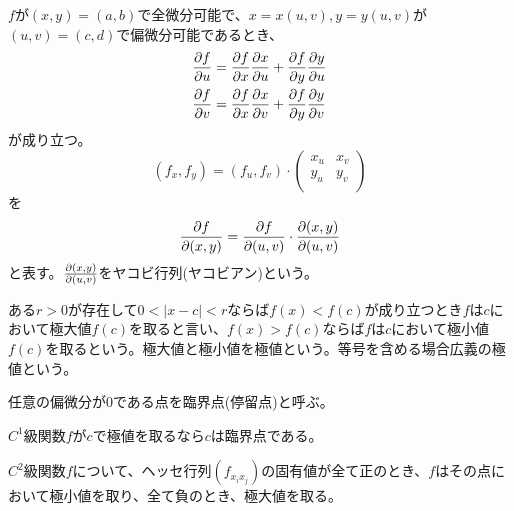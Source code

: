 	\begin{cor}
		$f$が$(x, y) = (a, b)$で全微分可能で、$x = x(u, v), y = y(u, v)$が$(u, v) = (c, d)$で偏微分可能であるとき、
		\begin{align*}
			\pd[f]{u} &= \pd[f]{x}\pd[x]{u} + \pd[f]{y}\pd[y]{u}\\
			\pd[f]{v} &= \pd[f]{x}\pd[x]{v} + \pd[f]{y}\pd[y]{v}\\
		\end{align*}
		が成り立つ。
			\[(f_x, f_y) = (f_u, f_v) \cdot \begin{pmatrix} x_u & x_v \\ y_u & y_v \\\end{pmatrix}\]
		を
			\[\pd[f]{(x, y)} = \pd[f]{(u, v)} \cdot \pd[(x, y)]{(u, v)}\]
		と表す。$\pd[(x, y)]{(u, v)}$をヤコビ行列(ヤコビアン)という。
	\end{cor}

	\begin{thm}[テイラーの定理]
	\end{thm}

\begin{dfn}[極値]
	ある$r > 0$が存在して$0 < |x - c| < r$ならば$f(x) < f(c)$が成り立つとき$f$は$c$において極大値$f(c)$を取ると言い、$f(x) > f(c)$ならば$f$は$c$において極小値$f(c)$を取るという。極大値と極小値を極値という。等号を含める場合広義の極値という。
\end{dfn}
任意の偏微分が0である点を臨界点(停留点)と呼ぶ。
\begin{prop}
	$C^1$級関数$f$が$c$で極値を取るなら$c$は臨界点である。
\end{prop}
\begin{thm}
	$C^2$級関数$f$について、ヘッセ行列$(f_{x_ix_j})$の固有値が全て正のとき、$f$はその点において極小値を取り、全て負のとき、極大値を取る。
\end{thm}